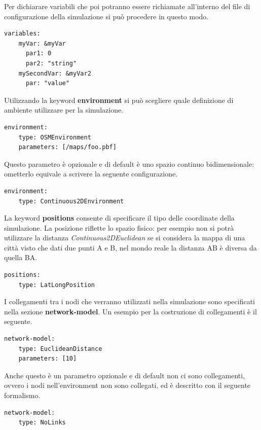 Per dichiarare variabili che poi potranno essere richiamate all'interno del file di configurazione della simulazione si può procedere in questo modo.
\medskip
\begin{lstlisting}[firstnumber=last,caption={Variabili simulazione}]
  variables:
    myVar: &myVar
      par1: 0
      par2: "string"
    mySecondVar: &myVar2
      par: "value"
\end{lstlisting}

Utilizzando la keyword \textbf{environment} si può scegliere quale definizione di ambiente utilizzare per la simulazione.
\medskip
\begin{lstlisting}[firstnumber=last,caption={Environment}]
  environment:
    type: OSMEnvironment
    parameters: [/maps/foo.pbf]
\end{lstlisting}
Questo parametro è opzionale e di default è uno spazio continuo bidimensionale: ometterlo equivale a scrivere la seguente configurazione.
\medskip
\begin{lstlisting}[firstnumber=last,caption={Default environment}]
  environment:
    type: Continuous2DEnvironment
\end{lstlisting}

La keyword \textbf{positions} consente di specificare il tipo delle coordinate della simulazione. La posizione riflette lo spazio fisico: per esempio non si potrà utilizzare la distanza \textit{Continuous2DEuclidean} se si considera la mappa di una città visto che dati due punti A e B, nel mondo reale la distanza AB è diversa da quella BA.
\medskip
\begin{lstlisting}[firstnumber=last,caption={Posizioni}]
  positions:
    type: LatLongPosition
\end{lstlisting}

I collegamenti tra i nodi che verranno utilizzati nella simulazione sono specificati nella sezione \textbf{network-model}. Un esempio per la costruzione di collegamenti è il seguente.
\medskip
\begin{lstlisting}[firstnumber=last,caption={Funzione linking-rule}]
  network-model:
    type: EuclideanDistance
    parameters: [10]
\end{lstlisting}
Anche questo è un parametro opzionale e di default non ci sono collegamenti, ovvero i nodi nell'environment non sono collegati, ed è descritto con il seguente formalismo.
\medskip
\begin{lstlisting}[firstnumber=last,caption={Default linking-rule}]
  network-model:
    type: NoLinks
\end{lstlisting}

